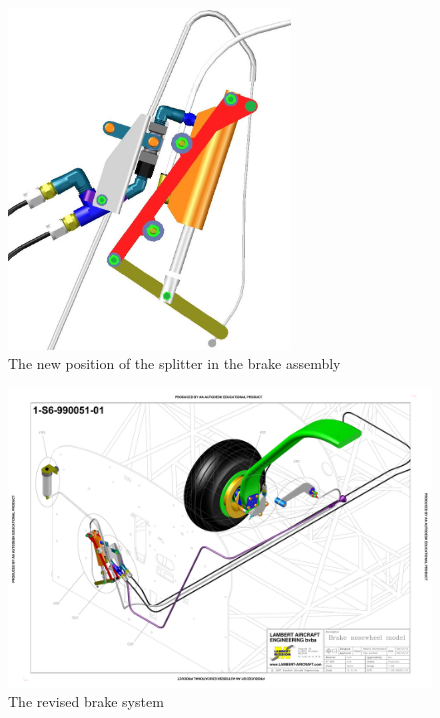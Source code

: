 \documentclass[11pt,a4paper]{article}
\begin{document}
\begin{figure}[ht!]
	\begin{center}
		\includegraphics[width=7.5cm]{pics/PIC022.jpg}
		\caption{The new position of the splitter in the brake assembly}
		\label{fig:PIC022}
	\end{center}
\end{figure}

\bigskip

\begin{figure}[ht!]
	\begin{center}
		\includegraphics[width=15cm,trim = 1.5cm 2cm 1.5cm 2cm, clip]{pics/PIC023.pdf}
		\caption{The revised brake system}
		\label{fig:PIC023}
	\end{center}
\end{figure}
\end{document}
